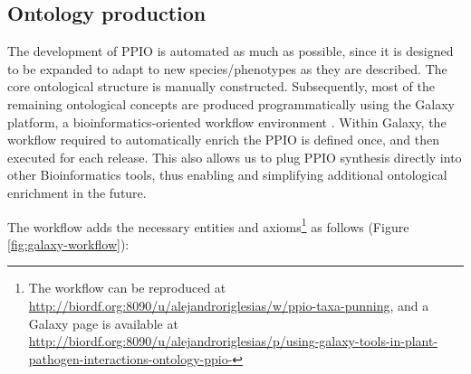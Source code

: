 \documentclass[sw]{iosart2c}
\begin{document}
\subsection{Ontology production}
The development of PPIO is automated as much as possible, since it is designed to be expanded to adapt to new species/phenotypes as they are described. The core ontological structure is manually constructed.  Subsequently, most of the remaining ontological concepts are produced programmatically using the Galaxy platform, a bioinformatics-oriented workflow environment \cite{galaxy}. Within Galaxy, the workflow required to automatically enrich the PPIO is defined once, and then executed for each release.  This also allows us to plug PPIO synthesis directly into other Bioinformatics tools, thus enabling and simplifying additional ontological enrichment in the future.

The workflow adds the necessary entities and axioms\footnote{The workflow can be reproduced at \url{http://biordf.org:8090/u/alejandroriglesias/w/ppio-taxa-punning}, and a Galaxy page is available at \url{http://biordf.org:8090/u/alejandroriglesias/p/using-galaxy-tools-in-plant-pathogen-interactions-ontology-ppio-}} as follows (Figure \ref{fig:galaxy-workflow}):
\end{document}
